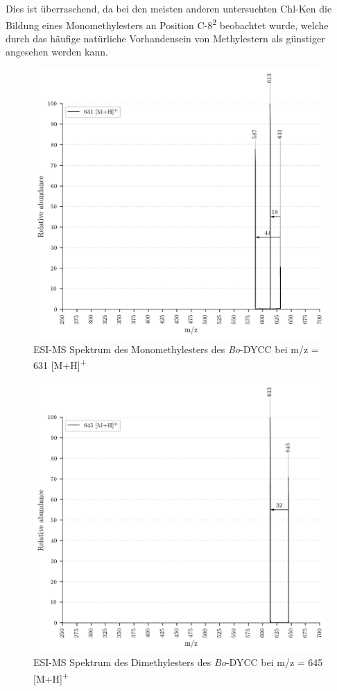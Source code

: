 Dies ist überraschend, da bei den meisten anderen untersuchten \gls{Chl-K}en die Bildung eines Monomethylesters an Position C-8\textsuperscript{2} beobachtet wurde, welche durch das häufige natürliche Vorhandensein von Methylestern als günstiger angesehen werden kann.

\begin{figure}[!htbp]
  \centering
  \includegraphics[width=\textwidth, height=0.7\textwidth]{figures/Kapitel7/Kataboliten/VWA_MS_631.png}
  \caption[ESI-MS Spektrum des Monomethylesters des \textit{Bo}-DYCC, Quelle: Author]{ESI-MS Spektrum des Monomethylesters des \textit{Bo}-DYCC bei m/z = 631 [M+H]\textsuperscript{+}}
  \label{fig:631MH}
\end{figure}

\begin{figure}[!htbp]
  \centering
  \includegraphics[width=\textwidth, height=0.6\textwidth]{figures/Kapitel7/Kataboliten/VWA_MS_645-2.png}
  \caption[ESI-MS Spektrum des Dimethylesters des \textit{Bo}-DYCC, Quelle: Author]{ESI-MS Spektrum des Dimethylesters des \textit{Bo}-DYCC bei m/z = 645 [M+H]\textsuperscript{+}}
  \label{fig:RP645MH}
\end{figure}


